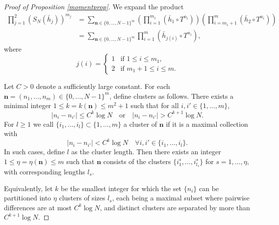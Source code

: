 \documentclass[10pt,a4paper]{amsart}
\begin{document}
\begin{proof}[Proof of Proposition \ref{momentprop}]
We expand the product
\begin{align*}
\prod_{j=1}^2 (S_N(\bar{h}_j))^{m_j} &= \sum_{\textbf{n}\in \{0,\ldots,N-1\}^m}
\left(\prod_{i=1}^{m_1} (\bar{h}_1 \circ T^{n_i})\right) \left(\prod_{i=m_1+1}^m (\bar{h}_2 \circ T^{n_i})\right)\\
&=\sum_{\textbf{n}\in \{0,\ldots,N-1\}^m} \prod_{i=1}^{m} (\bar{h}_{j(i)} \circ T^{n_i}),
\end{align*}
where
\begin{equation*}
j(i)=\begin{cases}
1 & \text{if } 1\leq i \leq m_1,\\
2 & \text{if } m_1 + 1 \leq i \leq m.
\end{cases}
\end{equation*}



Let $ C > 0 $ denote a sufficiently large constant. For each $\textbf{n}= (n_1, \dots, n_m)\in \{0,\ldots,N-1\}^m$, define clusters as follows. There exists a minimal integer $1 \leq k=k(\textbf{n}) \leq m^2 + 1$ such that for all $i, i'\in \{1,\dots,m\},$
\begin{equation}\label{nigp}
|n_i - n_{i'}| \leq C^k \log N \quad \text{or} \quad |n_i - n_{i'}| > C^{k+1} \log N.
\end{equation}
For $l\geq 1$ we call $\{i_1,\ldots,i_l\}\subset \{1,\ldots,m\}$ a cluster of $\textbf{n}$ if it is a maximal collection with
\begin{equation*}
|n_i - n_{i'}| < C^k \log N \quad \forall i,i'\in \{i_1,\ldots,i_l\}.
\end{equation*}
In such cases, define $ l $ as the cluster length. Then there exists an integer $1\leq \eta = \eta(\textbf{n}) \leq m$ such that $ \textbf{n}$ consists of the clusters $\{i^s_1, \dots, i^s_{l_s}\}$ for $ s = 1, \dots, \eta $, with corresponding lengths $ l_s $.


Equivalently, let $ k $ be the smallest integer for which the set $\{n_i\}$ can be partitioned into $\eta$ clusters of sizes $l_s$, each being a maximal subset where pairwise differences are at most $C^k \log N$, and distinct clusters are separated by more than $C^{k+1} \log N$.


\end{proof}
\end{document}
